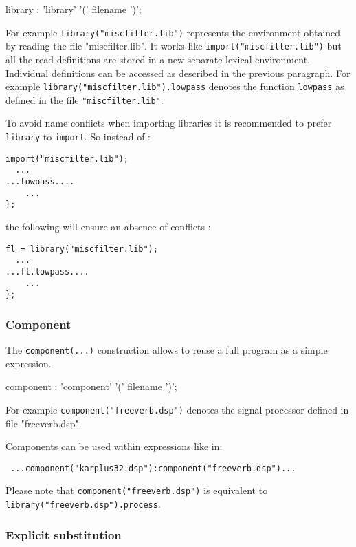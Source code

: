 \begin{rail}
library :    'library' '(' filename ')';
\end{rail}

For example \lstinline'library("miscfilter.lib")' represents the environment 
obtained by reading the file "miscfilter.lib". It works like \lstinline'import("miscfilter.lib")' but all the read definitions are stored in a new separate lexical environment. Individual definitions can be accessed as described in the previous paragraph. For example \lstinline'library("miscfilter.lib").lowpass' denotes the function \lstinline'lowpass' as defined in the file \lstinline'"miscfilter.lib"'.

To avoid name conflicts when importing libraries it is recommended to prefer \lstinline'library' to \lstinline'import'. So instead of :

\begin{lstlisting}
import("miscfilter.lib");
  ...
...lowpass....
	...
};
\end{lstlisting}
the following will ensure an absence of conflicts : 
\begin{lstlisting}
fl = library("miscfilter.lib");
  ...
...fl.lowpass....
	...
};
\end{lstlisting}

\subsubsection{Component} 
The \lstinline'component(...)' construction allows to reuse a full \faust program as a simple expression.

\begin{rail}
component :    'component' '(' filename ')';
\end{rail}

 For example \lstinline'component("freeverb.dsp")' denotes the signal processor defined in file "freeverb.dsp". 
 
 Components can be used within expressions like in: 
 \begin{lstlisting}
 ...component("karplus32.dsp"):component("freeverb.dsp")... 
 \end{lstlisting}
 
 Please note that \lstinline'component("freeverb.dsp")' is equivalent to \lstinline'library("freeverb.dsp").process'.

\subsubsection{Explicit substitution} 

